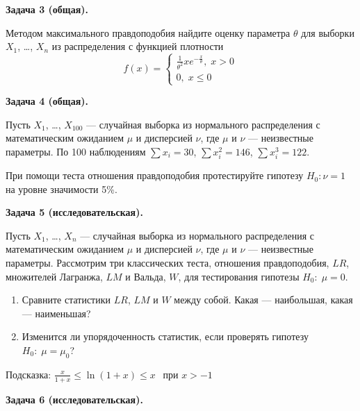 \documentclass[12pt, a4paper]{article}\usepackage[]{graphicx}\usepackage[]{color}
\begin{document}
				\vspace{0.5cm}

				\textbf{Задача 3 (общая).}


				Методом максимального правдоподобия найдите оценку параметра $\theta$ для выборки $X_1$, \ldots, $X_n$ из распределения с функцией плотности
				\[
				f(x)=\begin{cases}
				\frac{1}{\theta^2}xe^{-\frac{x}{\theta}}, \; x>0 \\
				0, \; x\leq 0
				\end{cases}
				\]

				\vspace{0.5cm}

				\textbf{Задача 4 (общая).}

				Пусть $X_1$, \ldots, $X_{100}$ — случайная выборка из нормального распределения с математическим ожиданием $\mu$ и дисперсией $\nu$, где $\mu$ и $\nu$ — неизвестные параметры. По 100 наблюдениям $\sum x_i=30$, $\sum x_i^2=146$, $\sum x_i^3=122$.

				При помощи теста отношения правдоподобия протестируйте гипотезу $H_0: \nu=1$ на уровне значимости 5\%.


				\textbf{Задача 5 (исследовательская).}

				\vspace{0.1cm}

				Пусть $X_1$, \ldots, $X_{n}$ — случайная выборка из нормального распределения с математическим ожиданием $\mu$ и дисперсией $\nu$, где $\mu$ и $\nu$ — неизвестные параметры. Рассмотрим три классических теста, отношения правдоподобия, $LR$, множителей Лагранжа, $LM$ и Вальда, $W$, для тестирования гипотезы $H_0: \; \mu=0$.

				\begin{enumerate}
					\item Сравните  статистики $LR$, $LM$ и $W$ между собой. Какая — наибольшая, какая — наименьшая?
					\item Изменится ли упорядоченность статистик, если проверять гипотезу $H_0: \; \mu=\mu_0$?
				\end{enumerate}

				\vspace{0.5cm}

				Подсказка: $
				\frac{x}{1+x} \leq \ln(1+x) \leq x\, \; \text{ при } x>-1
				$

				\vspace{0.5cm}

				\textbf{Задача 6 (исследовательская).}
				\thispagestyle{empty}
				\vspace{0.1cm}
\end{document}
